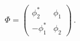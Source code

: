 \begin{equation}
\Phi =  \left( \begin{array}{cc} \phi_2^{*} & \phi_1 \\ -\phi_1^{*} & 
\phi_2 \end{array} \right) \, .
\end{equation}

